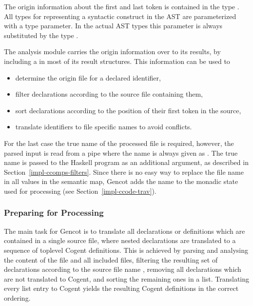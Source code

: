 The origin information about the first and last token is contained in the type . All types for representing
a syntactic construct in the AST are parameterized with a type parameter. In the actual AST types this parameter is always 
substituted by the type . 

The analysis module carries the origin information over to its results, by including a  in most of its
result structures. This information can be used to
\begin{itemize}
\item determine the origin file for a declared identifier,
\item filter declarations according to the source file containing them,
\item sort declarations according to the position of their first token in the source,
\item translate identifiers to file specific names to avoid conflicts.
\end{itemize}

For the last case the true name of the processed file is required, however, the parsed input is read from a pipe where
the name is always given as . The true name is passed to the Haskell program as an additional 
argument, as described in Section~\ref{impl-ccomps-filters}. Since there is no easy way to replace the file name in
all  values in the semantic map, Gencot adds the name to the monadic state used for processing
(see Section~\ref{impl-ccode-trav}).

\subsubsection{Preparing for Processing}

The main task for Gencot is to translate all declarations or definitions which are contained in a single source file, where
nested declarations are translated to a sequence of toplevel Cogent definitions. This is achieved by parsing and analysing
the content of the file and all included files, filtering the resulting set of declarations according to the source file name
, removing all declarations which are not translated to Cogent, and sorting the remaining ones in a list. 
Translating every list entry to Cogent yields the resulting Cogent definitions in the correct ordering.


